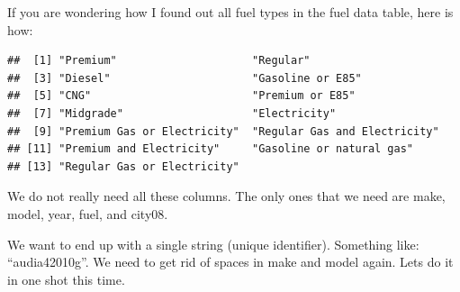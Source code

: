 \documentclass[]{book}
\newenvironment{Shaded}{\begin{snugshade}}{\end{snugshade}}
\newcommand{\CommentTok}[1]{\textcolor[rgb]{0.56,0.35,0.01}{\textit{#1}}}
\newcommand{\KeywordTok}[1]{\textcolor[rgb]{0.13,0.29,0.53}{\textbf{#1}}}
\newcommand{\NormalTok}[1]{#1}
\newcommand{\OperatorTok}[1]{\textcolor[rgb]{0.81,0.36,0.00}{\textbf{#1}}}
\newcommand{\StringTok}[1]{\textcolor[rgb]{0.31,0.60,0.02}{#1}}
\begin{document}
If you are wondering how I found out all fuel types in the fuel data table, here is how:

\begin{Shaded}
\end{Shaded}

\begin{verbatim}
##  [1] "Premium"                     "Regular"                    
##  [3] "Diesel"                      "Gasoline or E85"            
##  [5] "CNG"                         "Premium or E85"             
##  [7] "Midgrade"                    "Electricity"                
##  [9] "Premium Gas or Electricity"  "Regular Gas and Electricity"
## [11] "Premium and Electricity"     "Gasoline or natural gas"    
## [13] "Regular Gas or Electricity"
\end{verbatim}

We do not really need all these columns. The only ones that we need are make, model, year, fuel, and city08.

\begin{Shaded}
\end{Shaded}

We want to end up with a single string (unique identifier). Something like: ``audia42010g''. We need to get rid of spaces in make and model again. Lets do it in one shot this time.

\begin{Shaded}
\end{Shaded}
\end{document}
